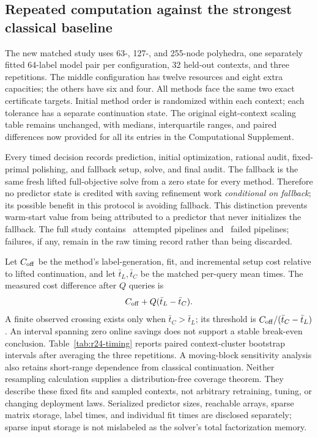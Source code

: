 \subsection{Repeated computation against the strongest classical baseline}
The new matched study uses 63-, 127-, and 255-node polyhedra, one separately
fitted 64-label model pair per configuration, 32 held-out contexts, and three
repetitions. The middle configuration has twelve resources and eight extra
capacities; the others have six and four. All methods face the same two exact
certificate targets. Initial method order is randomized within each context;
each tolerance has a separate continuation state. The original eight-context
scaling table remains unchanged, with medians, interquartile ranges, and paired
differences now provided for all its entries in the Computational Supplement.

Every timed decision records prediction, initial optimization, rational audit,
fixed-primal polishing, and fallback setup, solve, and final audit. The fallback
is the same fresh lifted full-objective solve from a zero state for every
method. Therefore no predictor state is credited with saving refinement work
\emph{conditional on fallback}; its possible benefit in this protocol is
avoiding fallback. This distinction prevents warm-start value from being
attributed to a predictor that never initializes the fallback. The full study
contains \RTwentyFourTimingRows\ attempted pipelines and
\RTwentyFourTimingFailures\ failed pipelines; failures, if any, remain in the
raw timing record rather than being discarded.

Let $C_{\rm off}$ be the method's label-generation, fit, and incremental setup
cost relative to lifted continuation, and let $\bar t_L,\bar t_C$ be the
matched per-query mean times. The measured cost difference after $Q$ queries is
\[
 C_{\rm off}+Q(\bar t_L-\bar t_C).
\]
A finite observed crossing exists only when $\bar t_C>\bar t_L$; its threshold
is $C_{\rm off}/(\bar t_C-\bar t_L)$. An interval spanning zero online savings
does not support a stable break-even conclusion. Table~\ref{tab:r24-timing}
reports paired context-cluster bootstrap intervals after averaging the three
repetitions. A moving-block sensitivity analysis also retains short-range dependence from classical continuation. Neither resampling calculation supplies a distribution-free coverage theorem. They describe these fixed fits and sampled contexts, not
arbitrary retraining, tuning, or changing deployment laws. Serialized predictor
sizes, reachable arrays, sparse matrix storage, label times, and individual fit
times are disclosed separately; sparse input storage is not mislabeled as the
solver's total factorization memory.

